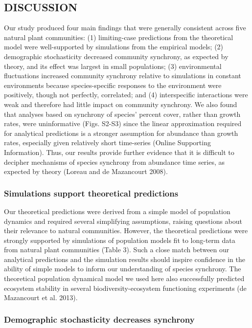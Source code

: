 \documentclass[12pt,]{article}
\begin{document}
\subsection{DISCUSSION}\label{discussion}

Our study produced four main findings that were generally consistent
across five natural plant communities: (1) limiting-case predictions
from the theoretical model were well-supported by simulations from the
empirical models; (2) demographic stochasticity decreased community
synchrony, as expected by theory, and its effect was largest in small
populations; (3) environmental fluctuations increased community
synchrony relative to simulations in constant environments because
species-specific responses to the environment were positively, though
not perfectly, correlated; and (4) interspecific interactions were weak
and therefore had little impact on community synchrony. We also found
that analyses based on synchrony of species' percent cover, rather than
growth rates, were uninformative (Figs. S2-S3) since the linear
approximation required for analytical predictions is a stronger
assumption for abundance than growth rates, especially given relatively
short time-series (Online Supporting Information). Thus, our results
provide further evidence that it is difficult to decipher mechanisms of
species synchrony from abundance time series, as expected by theory
(Loreau and {{de Mazancourt}} 2008).

\subsubsection{Simulations support theoretical
predictions}\label{simulations-support-theoretical-predictions}

Our theoretical predictions were derived from a simple model of
population dynamics and required several simplifying assumptions,
raising questions about their relevance to natural communities. However,
the theoretical predictions were strongly supported by simulations of
population models fit to long-term data from natural plant communities
(Table 3). Such a close match between our analytical predictions and the
simulation results should inspire confidence in the ability of simple
models to inform our understanding of species synchrony. The theoretical
population dynamical model we used here also successfully predicted
ecosystem stability in several biodiversity-ecosystem functioning
experiments ({{de Mazancourt}} et al. 2013).

\subsubsection{Demographic stochasticity decreases
synchrony}\label{demographic-stochasticity-decreases-synchrony}
\end{document}
